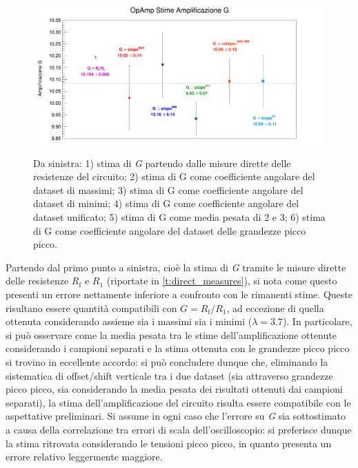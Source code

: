 \documentclass[a4paper,11pt]{article} %
\begin{document}
\begin{figure}[H]
	\centering
	\includegraphics[width=15cm]{../Plots/Report_Plots/opamp_comp.png}
	\caption{Da sinistra: 1) stima di \textit{G} partendo dalle misure dirette delle resistenze del circuito;
	2) stima di G come coefficiente angolare del dataset di massimi; 3) stima di G come coefficiente 
	angolare del dataset di minimi; 4) stima di G come coefficiente angolare del dataset unificato; 
	5) stima di G come media pesata di 2 e 3; 6) stima di G come coefficiente angolare del dataset delle 
	grandezze picco picco.}
	\label{i:opamp_comp}
\end{figure}

\noindent Partendo dal primo punto a sinistra, cioè la stima di \textit{G} tramite le misure dirette delle resistenze
$R_{\text{f}}$ e $R_{1}$ (riportate in \autoref{t:direct_measures}), si nota come questo presenti un errore nettamente
inferiore a confronto con le rimanenti stime. Queste risultano essere quantità compatibili con $G=R_{\text{f}}/R_{1}$,
ad eccezione di quella ottenuta considerando assieme sia i massimi sia i minimi ($\lambda = 3.7$). In particolare, si
può osservare come la media pesata tra le stime dell'amplificazione ottenute considerando i campioni separati e la stima
ottenuta con le grandezze picco picco si trovino in eccellente accordo: si può concludere dunque che, eliminando la
sistematica di offset/shift verticale tra i due dataset (sia attraverso grandezze picco picco, sia considerando la media
pesata dei risultati ottenuti dai campioni separati), la stima dell'amplificazione del circuito risulta essere
compatibile con le aspettative preliminari. Si assume in ogni caso che l'errore su \textit{G} sia sottostimato a causa
della correlazione tra errori di scala dell'oscilloscopio: si preferisce dunque la stima ritrovata considerando le
tensioni picco picco, in quanto presenta un errore relativo leggermente maggiore.
\end{document}
